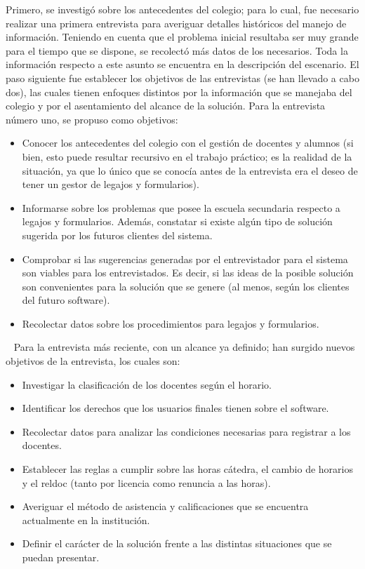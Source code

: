\normalsize{ \indent
Primero, se investigó sobre los antecedentes del colegio;
para lo cual, fue necesario realizar una primera entrevista
para averiguar detalles históricos del manejo de información.
Teniendo en cuenta que el problema inicial resultaba ser
muy grande para el tiempo que se dispone, se recolectó
más datos de los necesarios. Toda la información respecto a
este asunto se encuentra en la descripción del escenario.
}
\newline
\normalsize{ \indent
El paso siguiente fue establecer los objetivos de las
entrevistas (se han llevado a cabo dos), las cuales tienen
enfoques distintos por la información que se manejaba del
colegio y por el asentamiento del alcance de la solución.
Para la entrevista número uno, se propuso como objetivos:
}
\begin{itemize}
  \item Conocer los antecedentes del colegio con el
  gestión de docentes y alumnos (si bien, esto puede
  resultar recursivo en el trabajo práctico; es la realidad
  de la situación, ya que lo único que se conocía antes de
  la entrevista era el deseo de tener un gestor de legajos
  y formularios).
  \item Informarse sobre los problemas que posee la escuela
  secundaria respecto a legajos y formularios. Además,
  constatar si existe algún tipo de solución sugerida por
  los futuros clientes del sistema.
  \item Comprobar si las sugerencias generadas por el
  entrevistador para el sistema son viables para los
  entrevistados. Es decir, si las ideas de la posible
  solución son convenientes para la solución que se genere
  (al menos, según los clientes del futuro software).
  \item Recolectar datos sobre los procedimientos para
  legajos y formularios.
\end{itemize}
\ \newline
\normalsize{ \indent
Para la entrevista más reciente, con un alcance ya definido;
han surgido nuevos objetivos de la entrevista, los cuales son:
}
\begin{itemize}
  \item Investigar la clasificación de los docentes según el
  horario.
  \item Identificar los derechos que los usuarios finales
  tienen sobre el software.
  \item Recolectar datos para analizar las condiciones
  necesarias para registrar a los docentes.
  \item Establecer las reglas a cumplir sobre las horas
  cátedra, el cambio de horarios y el \gls{reldoc} (tanto
  por licencia como renuncia a las horas).
  \item Averiguar el método de asistencia y calificaciones
  que se encuentra actualmente en la institución.
  \item Definir el carácter de la solución frente a las
  distintas situaciones que se puedan presentar.
\end{itemize}
